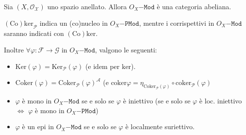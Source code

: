 \begin{theorem}{}
    Sia \({(X, \mathcal{O_X})}\) uno spazio anellato. Allora
    \(O_X\mathtt{-Mod}\) è una categoria abeliana.
    \begin{note}[zione]
        \(\mathrm{(Co)ker}_{\mathcal{P}} \) indica un (co)nucleo in
        \(O_X\mathtt{-PMod}\), mentre i corrispettivi in \(O_X\mathtt{-Mod}\)
        saranno indicati con \(\mathrm{(Co)ker}\).
    \end{note}

    Inoltre \(\forall \varphi : \mathcal{F} \to \mathcal{G}\) in
    \(O_X\mathtt{-Mod}\), valgono le seguenti:
\begin{itemize}[label = --]
    \item \(\mathrm{Ker}{(\varphi )} =
    \mathrm{Ker}_\mathcal{P}{(\varphi )}\) (e idem per \(\mathrm{ker}\)).
\item \(\mathrm{Coker}{(\varphi )} = \mathrm{Coker}_\mathcal{P}{(\varphi
    )}^{\mathcal{A}}\) (e \(\mathrm{coker}\varphi =
    \eta_{\mathrm{Coker}_\mathcal{P}{(\varphi)}} \circ
    \mathrm{coker}_{\mathcal{P}}{(\varphi)}\) 
    \item \(\varphi \) è mono in \(O_X\mathtt{-Mod}\) se e solo se \(\varphi \)
        è iniettivo (se e solo se \(\varphi \) è loc. iniettivo \(\iff\)
        \(\varphi \) è mono in \(O_X\mathtt{-PMod}\))
    \item \(\varphi \) è un epi in \(O_X\mathtt{-Mod}\) se e solo se \(\varphi
        \) è localmente suriettivo.
\end{itemize}
\end{theorem}
